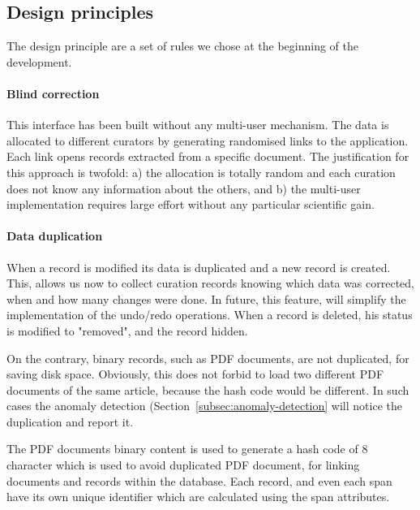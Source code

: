 \documentclass[a4paper]{article}
\begin{document}

\subsection{Design principles}
\label{subsec:design-principles}

The design principle are a set of rules we chose at the beginning of the development. 

\paragraph{Blind correction}
This interface has been built without any multi-user mechanism. 
The data is allocated to different curators by generating randomised links to the application. Each link opens records extracted from a specific document. 
The justification for this approach is twofold: a) the allocation is totally random and each curation does not know any information about the others, and b) the multi-user implementation requires large effort without any particular scientific gain. 

\paragraph{Data duplication} When a record is modified its data is duplicated and a new record is created. 
This, allows us now to collect curation records knowing which data was corrected, when and how many changes were done. In future, this feature, will simplify the implementation of the undo/redo operations. 
When a record is deleted, his status is modified to "removed", and the record hidden. 

On the contrary, binary records, such as PDF documents, are not duplicated, for saving disk space. Obviously, this does not forbid to load two different PDF documents of the same article, because the hash code would be different. In such cases the anomaly detection (Section~\ref{subsec:anomaly-detection} will notice the duplication and report it. 

The PDF documents binary content is used to generate a hash code of 8 character which is used to avoid duplicated PDF document, for linking documents and records within the database. Each record, and even each span have its own unique identifier which are calculated using the span attributes.
\end{document}
